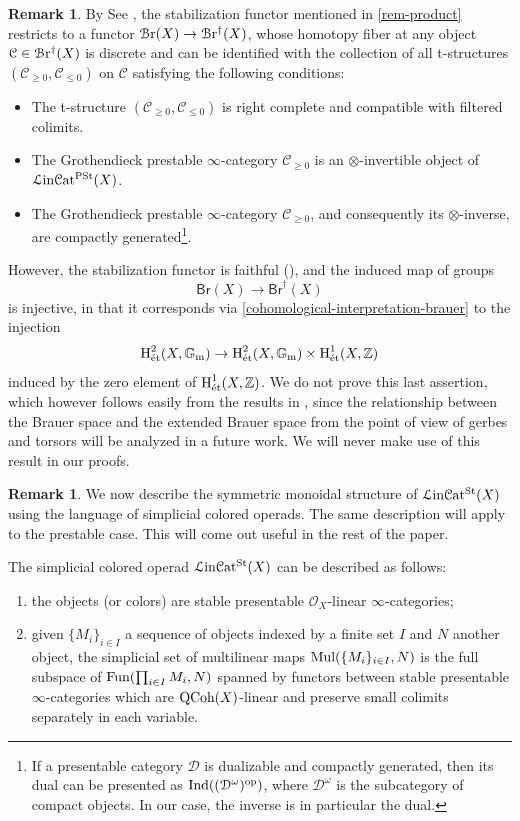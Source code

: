 \documentclass[11pt, twoside]{article} %
\numberwithin{equation}{section}
\theoremstyle{plain}
\theoremstyle{definition}
\newtheorem{rem}[thm]{Remark}
\newcommand{\Z}{\mathbb Z}
\newcommand{\cc}{\mathcal C}
\newcommand{\Gm}{\mathbb G_{\mathrm{m}}}
\newcommand{\QCoh}{\textup{QCoh}}
\newcommand{\tH}{\textup{H}}
\newcommand{\cO}{{\mathcal O}}
\newcommand{\Br}{\mathsf{Br}}
\newcommand{\cBr}{\mathcal{B}\textup{r}}
\newcommand{\Bre}{\mathsf{Br}^\dagger}
\newcommand{\cBre}{\mathcal{B}\textup{r}^\dagger}
\newcommand{\ett}{{\textup{\'et}}}
\newcommand{\Lin}{\mathcal L\textup{in}\mathcal{C}\textup{at}^{\textup{St}}}
\newcommand{\Linpre}{{\mathcal L\textup{in}\mathcal{C}\textup{at}^{\textup{PSt}}}}
\begin{document}
 
	\begin{rem}\label{t-structures}
	     By See \cite[Remark 11.5.7.3]{SAG}, the stabilization functor mentioned in \cref{rem-product} restricts to a functor $\cBr(X)\to \cBre(X)$, whose homotopy fiber at any object $\cc\in \cBre(X)$ is discrete and can be identified with the collection of all t-structures $(\cc_{\geq 0},\cc_{\leq 0})$ on $\cc$ satisfying the following
conditions:
\begin{itemize}\item The t-structure $(\cc_{\geq 0},\cc_{\leq 0})$ is right complete and compatible with filtered colimits.
\item The Grothendieck prestable $\infty$-category $\cc_{\geq 0}$ is an $\otimes$-invertible object of $\Linpre(X)$.
\item The Grothendieck prestable $\infty$-category $\cc_{\geq 0}$, and consequently its $\otimes$-inverse, are compactly generated\footnote{If a presentable category $\mathcal D$ is dualizable and compactly generated, then its dual can be presented as $\textup{Ind}((\mathcal D^\omega)^\textup{op})$, where $\mathcal D^\omega$ is the subcategory of compact objects. In our case, the inverse is in particular the dual.}.\end{itemize}

However, the stabilization functor is faithful (\cite[Proposition C.3.1.1]{SAG}), and the induced map of groups $$\Br(X)\to \Bre(X)$$ is injective, in that it corresponds via \cref{cohomological-interpretation-brauer} to the injection $$\tH^2_\ett(X,\Gm)\to \tH^2_\ett(X,\Gm)\times\tH^1_\ett(X,\Z)$$ induced by the zero element of $\tH^1_\ett(X,\Z)$. We do not prove this last assertion, which however follows easily from the results in \cite[Section 11.5]{SAG}, since the relationship between the Brauer space and the extended Brauer space from the point of view of gerbes and torsors will be analyzed in a future work. We will never make use of this result in our proofs.
	\end{rem}
 
	

 
\begin{rem}
We now describe the symmetric monoidal structure of $\Lin(X)$ using the language of simplicial colored operads. The same description will apply to the prestable case. This will come out useful in the rest of the paper.
    
The simplicial colored operad $\Lin(X)$ can be described as follows:
\begin{enumerate}
    \item the objects (or colors) are stable presentable $\cO_X$-linear $\infty$-categories;
    \item given $\{ M_i \}_{i \in I}$ a sequence of objects indexed by a finite set $I$ and $N$ another object, the simplicial set of multilinear maps $\textup{Mul}(\{ M_i\}_{i \in I}, N)$ is the full subspace of $\textup{Fun}(\prod_{i \in I}M_i,N)$ spanned by functors between stable presentable $\infty$-categories which are $\QCoh(X)$-linear and preserve small colimits separately in each variable.
\end{enumerate} 
\end{rem}
\end{document}
